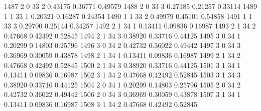 \documentclass{article}
\begin{document}
\begin{Woutput}
1487      2       0      33       2       0.43175    0.36771    0.49579
1488      2       0      33       3       0.27185    0.21257    0.33114
1489      1       1      33       1       0.20321    0.16287    0.24354
1490      1       1      33       2       0.49979    0.45101    0.54858
1491      1       1      33       3       0.29700    0.25144    0.34257
1492      2       1      34       1       0.13411    0.09836    0.16987
1493      2       1      34       2       0.47668    0.42492    0.52845
1494      2       1      34       3       0.38920    0.33716    0.44125
1495      3       0      34       1       0.20299    0.14803    0.25796
1496      3       0      34       2       0.42732    0.36022    0.49442
1497      3       0      34       3       0.36969    0.30059    0.43878
1498      2       1      34       1       0.13411    0.09836    0.16987
1499      2       1      34       2       0.47668    0.42492    0.52845
1500      2       1      34       3       0.38920    0.33716    0.44125
1501      3       1      34       1       0.13411    0.09836    0.16987
1502      3       1      34       2       0.47668    0.42492    0.52845
1503      3       1      34       3       0.38920    0.33716    0.44125
1504      2       0      34       1       0.20299    0.14803    0.25796
1505      2       0      34       2       0.42732    0.36022    0.49442
1506      2       0      34       3       0.36969    0.30059    0.43878
1507      3       1      34       1       0.13411    0.09836    0.16987
1508      3       1      34       2       0.47668    0.42492    0.52845


\end{Woutput}
\end{document}
